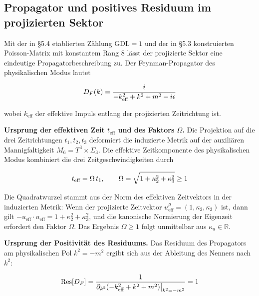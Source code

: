 ﻿\documentclass[11pt,letterpaper]{article}
\begin{document}
\subsection{Propagator und positives Residuum im projizierten Sektor}
Mit der in §5.4 etablierten Zählung $\mathrm{GDL} = 1$ und der in §5.3 konstruierten Poisson-Matrix mit konstantem Rang $8$ lässt der projizierte Sektor eine eindeutige Propagatorbeschreibung zu. Der Feynman-Propagator des physikalischen Modus lautet

\begin{equation*}
  \resizebox{\ifdim\width>\linewidth \linewidth\else\width\fi}{!}{$\displaystyle D_F(k) = \frac{i}{-k_{\text{eff}}^2 + k^2 + m^2 - i\epsilon}$}
\end{equation*}

wobei $k_{\text{eff}}$ der effektive Impuls entlang der projizierten Zeitrichtung ist.

\textbf{Ursprung der effektiven Zeit $t_{\text{eff}}$ und des Faktors $\Omega$.} Die Projektion auf die drei Zeitrichtungen $t_1, t_2, t_3$ deformiert die induzierte Metrik auf der auxiliären Mannigfaltigkeit $M_6 = T^3 \times \Sigma_3$. Die effektive Zeitkomponente des physikalischen Modus kombiniert die drei Zeitgeschwindigkeiten durch

\begin{equation*}
  \resizebox{\ifdim\width>\linewidth \linewidth\else\width\fi}{!}{$\displaystyle t_{\text{eff}} = \Omega\,t_1, \qquad \Omega = \sqrt{1 + \kappa_2^2 + \kappa_3^2} \geq 1$}
\end{equation*}

Die Quadratwurzel stammt aus der Norm des effektiven Zeitvektors in der induzierten Metrik: Wenn der projizierte Zeitvektor $u^{\mu}_{\text{eff}} = (1, \kappa_2, \kappa_3)$ ist, dann gilt $-u_{\text{eff}} \cdot u_{\text{eff}} = 1 + \kappa_2^2 + \kappa_3^2$, und die kanonische Normierung der Eigenzeit erfordert den Faktor $\Omega$. Das Ergebnis $\Omega \geq 1$ folgt unmittelbar aus $\kappa_a \in \mathbb{R}$.

\textbf{Ursprung der Positivität des Residuums.} Das Residuum des Propagators am physikalischen Pol $k^2 = -m^2$ ergibt sich aus der Ableitung des Nenners nach $k^2$:

\begin{equation*}
  \resizebox{\ifdim\width>\linewidth \linewidth\else\width\fi}{!}{$\displaystyle \mathrm{Res}[D_F] = \frac{1}{\partial_{k^2}(-k_{\text{eff}}^2 + k^2 + m^2)\big|_{k^2 = -m^2}} = 1$}
\end{equation*}
\end{document}
